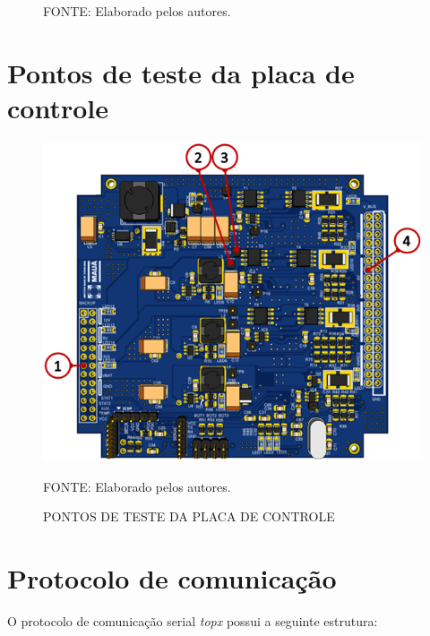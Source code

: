 \documentclass[
	12pt,				%
	openright,			%
	oneside,			%
	a4paper,			%
	english,			%
	french,				%
	spanish,			%
	brazil,				%
	oldfontcommands
	]{abntex2}
\begin{document}
\begin{apendicesenv}
\begin{figure}[th]
		\begin{small}
			FONTE: Elaborado pelos autores.
		\end{small}	
	\end{figure}
	
\chapter[Pontos de teste da placa de controle]{Pontos de teste da placa de controle}\label{T_Cont}

	\begin{figure}[th]
		\caption{PONTOS DE TESTE DA PLACA DE CONTROLE}
		\centering
		\includegraphics[width=0.75\linewidth]{./anexos/t_cont}
		
		\begin{small}
			FONTE: Elaborado pelos autores.
		\end{small}	
	\end{figure}
	
\chapter[Protocolo de comunicação]{Protocolo de comunicação}\label{Prot_Serial}

	O protocolo de comunicação serial \textit{topx} possui a seguinte estrutura:


\end{apendicesenv}
\end{document}

